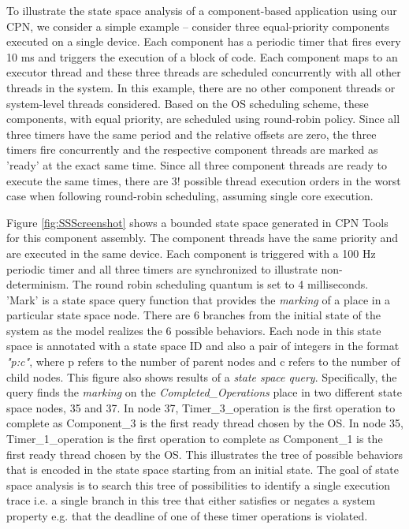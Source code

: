 To illustrate the state space analysis of a component-based application using our CPN, we consider a simple example -- consider three equal-priority components executed on a single device. Each component has a periodic timer that fires every 10 ms and triggers the execution of a block of code. Each component maps to an executor thread and these three threads are scheduled concurrently with all other threads in the system. In this example, there are no other component threads or system-level threads considered. Based on the OS scheduling scheme, these components, with equal priority, are scheduled using round-robin policy. Since all three timers have the same period and the relative offsets are zero, the three timers fire concurrently and the respective component threads are marked as 'ready' at the exact same time. Since all three component threads are ready to execute the same times, there are $3!$ possible thread execution orders in the worst case when following round-robin scheduling, assuming single core execution. 

Figure \ref{fig:SSScreenshot} shows a bounded state space generated in CPN Tools for this component assembly. The component threads have the same priority and are executed in the same device. Each component is triggered with a 100 Hz periodic timer and all three timers are synchronized to illustrate non-determinism. The round robin scheduling quantum is set to 4 milliseconds. 'Mark' is a state space query function that provides the \emph{marking} of a place in a particular state space node. There are 6 branches from the initial state of the system as the model realizes the 6 possible behaviors. Each node in this state space is annotated with a state space ID and also a pair of integers in the format \emph{"p:c"}, where p refers to the number of parent nodes and c refers to the number of child nodes. This figure also shows results of a \emph{state space query}. Specifically, the query finds the \emph{marking} on the \emph{Completed\_Operations} place in two different state space nodes, 35 and 37. In node 37, Timer\_3\_operation is the first operation to complete as Component\_3 is the first ready thread chosen by the OS. In node 35, Timer\_1\_operation is the first operation to complete as Component\_1 is the first ready thread chosen by the OS. This illustrates the tree of possible behaviors that is encoded in the state space starting from an initial state. The goal of state space analysis is to search this tree of possibilities to identify a single execution trace i.e. a single branch in this tree that either satisfies or negates a system property e.g. that the deadline of one of these timer operations is violated. 



